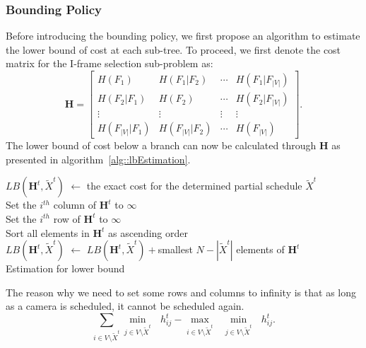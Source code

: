 \subsubsection{Bounding Policy}
Before introducing the bounding policy, we first propose an algorithm to estimate the lower bound of cost at each sub-tree.
To proceed, we first denote the cost matrix for the I-frame selection sub-problem as:
\begin{equation}
\mathbf{H} = \left[ \begin{array}{cccc}
H(F_1) &H(F_1|F_2) &\cdots &H(F_1|F_{|V|}) \\
H(F_2|F_1) &H(F_2) &\cdots &H(F_2|F_{|V|}) \\
\vdots &\vdots &\vdots &\vdots \\
H(F_{|V|}|F_1) &H(F_{|V|}|F_2) &\cdots &H(F_{|V|})
\end{array} \right].
\label{eq::bbCostMatrix}
\end{equation}
The lower bound of cost below a branch can now be calculated through $\mathbf{H}$ as presented in algorithm~\ref{alg::lbEstimation}.
%
\IncMargin{1em}
\begin{algorithm}[]
 \SetAlgoLined
 \BlankLine
 $LB(\mathbf{H}^t,\tilde{X}^t)$ $\gets$ the exact cost for the determined partial schedule $\tilde{X}^t$ \\
 {
 	Set the $i^{th}$ column of $\mathbf{H}^t$ to $\infty$ \\
 	Set the $i^{th}$ row of $\mathbf{H}^t$ to $\infty$ \\
 }
 Sort all elements in $\mathbf{H}^t$ as ascending order \\
 $LB(\mathbf{H}^t,\tilde{X}^t)$ $\gets$ $LB(\mathbf{H}^t,\tilde{X}^t)+$smallest $N-|\tilde{X}^t|$ elements of $\mathbf{H}^t$ \\
 \caption{\label{alg::lbEstimation}Estimation for lower bound}
\end{algorithm}
\DecMargin{1em}
%
The reason why we need to set some rows and columns to infinity is that as long as a camera is scheduled, it cannot be scheduled again.
\begin{equation}
\sum_{i\in V\setminus \tilde{X}^t} \underset{j \in V\setminus \tilde{X}^t}{\min}\text{ }h_{ij}^{t} - 
\underset{i\in V\setminus \tilde{X}^t}{\max} \text{ } \underset{j \in V\setminus \tilde{X}^t}{\min}\text{ }h_{ij}^{t}.
\end{equation}
%
